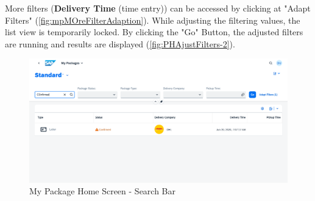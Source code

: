 More filters (\textbf{Delivery Time} (time entry)) can be accessed by clicking at "Adapt Filters" (\autoref{fig:mpMOreFilterAdaption}). While adjusting the filtering values, the list view is temporarily locked. By clicking the "Go" Button, the adjusted filters are running and results are displayed (\autoref{fig:PHAjustFilters-2}).

\begin{figure}[htb!]
	\centering
	\includegraphics[width=0.9\linewidth]{images/user_doc/myPack/searchbar.png}
	\caption{My Package Home Screen - Search Bar}
	\label{fig:mpSearchBar}
\end{figure}


